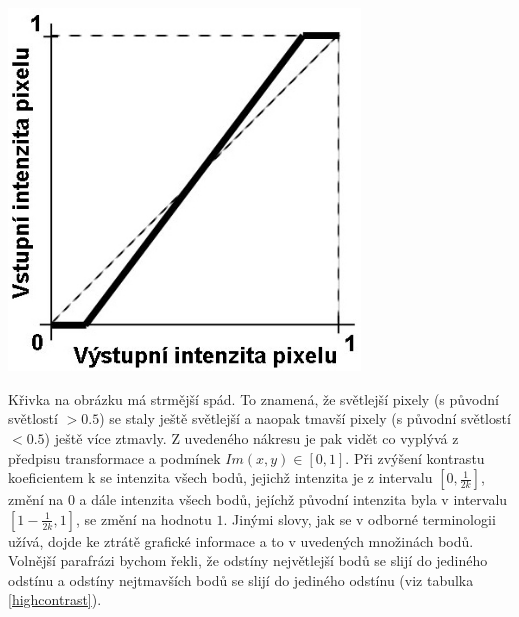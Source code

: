 \begin{center}
\includegraphics[width=0.7\textwidth,height=0.7\textwidth]{Text/IMG/Kontrast_Transformace_1.jpg}
\end{center}

Křivka na obrázku má strmější spád. To znamená, že světlejší pixely (s původní světlostí $> 0.5$) se staly ještě světlejší a naopak tmavší pixely (s původní světlostí $< 0.5$) ještě více ztmavly. Z uvedeného nákresu je pak vidět co vyplývá z předpisu transformace a podmínek $ Im(x,y) \in [0,1]$. Při zvýšení kontrastu koeficientem k se intenzita všech bodů, jejichž intenzita je z intervalu $ [0,\frac{1}{2k}] $, změní na $0$ a dále intenzita všech bodů, jejíchž původní intenzita byla v intervalu $[1-\frac{1}{2k},1]$, se změní na hodnotu $1$. Jinými slovy, jak se v odborné terminologii užívá, dojde ke ztrátě grafické informace a to v uvedených množinách bodů. Volnější parafrázi bychom řekli, že odstíny největlejší bodů se slijí do jediného odstínu a odstíny nejtmavších bodů se slijí do jediného odstínu (viz tabulka \ref{highcontrast}).

